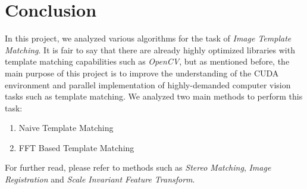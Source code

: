 \chapter{Conclusion}
In this project, we analyzed various algorithms for the task of \textit{Image Template Matching}. It is fair to say that there are already highly optimized libraries with template matching capabilities such as \textit{OpenCV}, but as mentioned before, the main purpose of this project is to improve the understanding of the CUDA environment and parallel implementation of highly-demanded computer vision tasks such as template matching.
We analyzed two main methods to perform this task:
\begin{enumerate}
	\item Naive Template Matching
	\item FFT Based Template Matching
\end{enumerate}
For further read, please refer to methods such as \textit{Stereo Matching}, \textit{Image Registration} and \textit{Scale Invariant Feature Transform}.